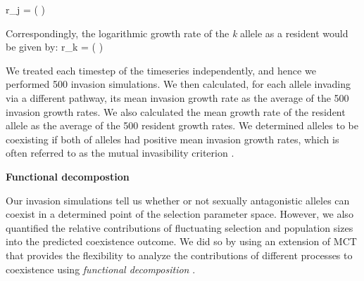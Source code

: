 \documentclass[12pt]{article}
\let\oldequation\equation
\let\oldendequation\endequation
\renewenvironment{equation}
  {\linenomathNonumbers\oldequation}
  {\oldendequation\endlinenomath}
\begin{document}
\begin{equation}
r_{j} =	\ln \left (  \right )
\label{invader}
\end{equation}

Correspondingly, the logarithmic growth rate of the \textit{k} allele as a resident would be given by:
\begin{equation}
r_{k} =	\ln \left (  \right )
\label{resident}
\end{equation}

We treated each timestep of the timeseries independently, and hence we performed 500 invasion simulations. We then calculated, for each allele invading via a different pathway, its mean invasion growth rate as the average of the 500 invasion growth rates. We also calculated the mean growth rate of the resident allele as the average of the 500 resident growth rates. We determined alleles to be coexisting if both of alleles had positive mean invasion growth rates, which is often referred to as the mutual invasibility criterion \citep{barabas_chessons_2018}.

\vspace{5mm}
\noindent\textbf{Functional decompostion}

Our invasion simulations tell us whether or not sexually antagonistic alleles can coexist in a determined point of the selection parameter space. However, we also quantified the relative contributions of fluctuating selection and population sizes into the predicted coexistence outcome. We did so by using an extension of MCT that provides the flexibility to analyze the contributions of different processes to coexistence using \textit{functional decomposition} \citep{ellner2016quantify,ellner_expanded_2019, shoemaker2020}.

\end{document}
